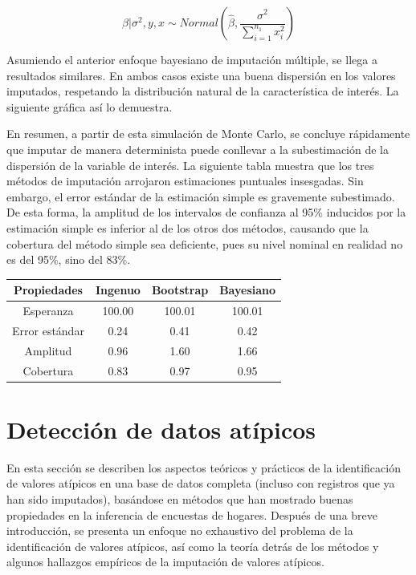 \documentclass[
  12pt,
  spanish,
]{book}
\begin{document}
\[
\beta | \sigma^2, y, x \sim Normal \left(\hat{\beta}, \frac{\sigma^2}{\sum_{i = 1}^{n_1} x_i^2} \right)
\]

Asumiendo el anterior enfoque bayesiano de imputación múltiple, se llega a resultados similares. En ambos casos existe una buena dispersión en los valores imputados, respetando la distribución natural de la característica de interés. La siguiente gráfica así lo demuestra.

En resumen, a partir de esta simulación de Monte Carlo, se concluye rápidamente que imputar de manera determinista puede conllevar a la subestimación de la dispersión de la variable de interés. La siguiente tabla muestra que los tres métodos de imputación arrojaron estimaciones puntuales insesgadas. Sin embargo, el error estándar de la estimación simple es gravemente subestimado. De esta forma, la amplitud de los intervalos de confianza al 95\% inducidos por la estimación simple es inferior al de los otros dos métodos, causando que la cobertura del método simple sea deficiente, pues su nivel nominal en realidad no es del 95\%, sino del 83\%.

\begin{longtable}[]{@{}cccc@{}}
\toprule
Propiedades & Ingenuo & Bootstrap & Bayesiano \\
\midrule
\endhead
Esperanza & 100.00 & 100.01 & 100.01 \\
Error estándar & 0.24 & 0.41 & 0.42 \\
Amplitud & 0.96 & 1.60 & 1.66 \\
Cobertura & 0.83 & 0.97 & 0.95 \\
\bottomrule
\end{longtable}

\hypertarget{detecciuxf3n-de-datos-atuxedpicos}{%
\chapter{Detección de datos atípicos}\label{detecciuxf3n-de-datos-atuxedpicos}}

En esta sección se describen los aspectos teóricos y prácticos de la identificación de valores atípicos en una base de datos completa (incluso con registros que ya han sido imputados), basándose en métodos que han mostrado buenas propiedades en la inferencia de encuestas de hogares. Después de una breve introducción, se presenta un enfoque no exhaustivo del problema de la identificación de valores atípicos, así como la teoría detrás de los métodos y algunos hallazgos empíricos de la imputación de valores atípicos.
\end{document}
